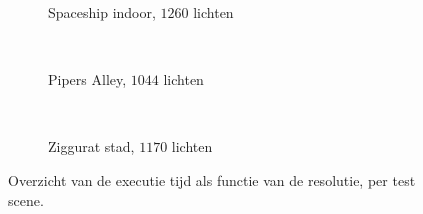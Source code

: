 \begin{figure}[p]
  \begin{adjustbox}{minipage=\textwidth, scale=0.7}
    \begin{subfigure}[b]{\textwidth}
      \centering
      \def\svgwidth{\textwidth}
      
      \caption{Spaceship indoor, $1260$ lichten}
      \label{fig:fds-test-resolution:indoor}
    \end{subfigure}
  \end{adjustbox} \\
  \begin{adjustbox}{minipage=\textwidth, scale=0.7}
    \begin{subfigure}[b]{\textwidth}
      \centering
      \def\svgwidth{\textwidth}
      
      \caption{Pipers Alley, $1044$ lichten}
      \label{fig:fds-test-resolution:alley}
    \end{subfigure}
  \end{adjustbox} \\
  \begin{adjustbox}{minipage=\textwidth, scale=0.7}
    \begin{subfigure}[b]{\textwidth}
      \centering
      \def\svgwidth{\textwidth}
      
      \caption{Ziggurat stad, $1170$ lichten}
      \label{fig:fds-test-resolution:city}
    \end{subfigure}
  \end{adjustbox}
  \caption{Overzicht van de executie tijd als functie van de resolutie,
           per test scene. }
  \label{fig:fds-test-resolution}
\end{figure}

